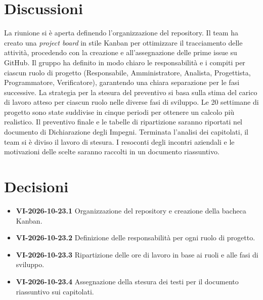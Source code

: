 \documentclass[11pt, a4paper]{article}
\begin{document}
\section{Discussioni}
La riunione si è aperta definendo l'organizzazione del repository. Il team ha creato una \textit{project board} in stile Kanban per ottimizzare il tracciamento delle attività, procedendo con la creazione e all'assegnazione delle prime issue su GitHub. \newline
Il gruppo ha definito in modo chiaro le responsabilità e i compiti per ciascun ruolo di progetto (Responsabile, Amministratore, Analista, Progettista, Programmatore, Verificatore), garantendo una chiara separazione per le fasi successive. \newline
La strategia per la stesura del preventivo si basa sulla stima del carico di lavoro atteso per ciascun ruolo nelle diverse fasi di sviluppo. Le 20 settimane di progetto sono state suddivise in cinque periodi per ottenere un calcolo più realistico. Il preventivo finale e le tabelle di ripartizione saranno riportati nel documento di Dichiarazione degli Impegni. \newline
Terminata l'analisi dei capitolati, il team si è diviso il lavoro di stesura. I resoconti degli incontri aziendali e le motivazioni delle scelte saranno raccolti in un documento riassuntivo.

\section{Decisioni}
\begin{itemize}
    \item \textbf{VI-2026-10-23.1} Organizzazione del repository e creazione della bacheca Kanban.
    \item \textbf{VI-2026-10-23.2} Definizione delle responsabilità per ogni ruolo di progetto.
    \item \textbf{VI-2026-10-23.3} Ripartizione delle ore di lavoro in base ai ruoli e alle fasi di sviluppo.
    \item \textbf{VI-2026-10-23.4} Assegnazione della stesura dei testi per il documento riassuntivo sui capitolati.
\end{itemize}
\end{document}
